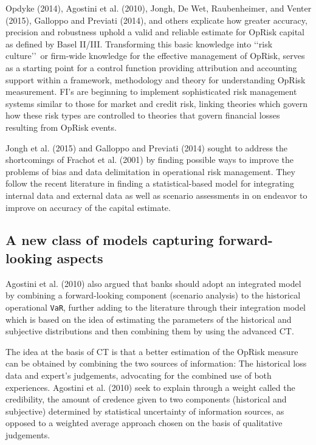 \documentclass[]{DissertateUSU}
\begin{document}
Opdyke (2014), Agostini et al. (2010), Jongh, De Wet, Raubenheimer, and
Venter (2015), Galloppo and Previati (2014), and others explicate how
greater accuracy, precision and robustness uphold a valid and reliable
estimate for OpRisk capital as defined by Basel II/III. Transforming
this basic knowledge into \lq\lq risk culture\rq\rq~or firm-wide
knowledge for the effective management of OpRisk, serves as a starting
point for a control function providing attribution and accounting
support within a framework, methodology and theory for understanding
OpRisk measurement. FI's are beginning to implement sophisticated risk
management systems similar to those for market and credit risk, linking
theories which govern how these risk types are controlled to theories
that govern financial losses resulting from OpRisk events. \medskip

Jongh et al. (2015) and Galloppo and Previati (2014) sought to address
the shortcomings of Frachot et al. (2001) by finding possible ways to
improve the problems of bias and data delimitation in operational risk
management. They follow the recent literature in finding a
statistical-based model for integrating internal data and external data
as well as scenario assessments in on endeavor to improve on accuracy of
the capital estimate.

\subsection{A new class of models capturing forward-looking aspects}
\label{ssec:A new class of models capturing forward-looking aspects}

Agostini et al. (2010) also argued that banks should adopt an integrated
model by combining a forward-looking component (scenario analysis) to
the historical operational \texttt{VaR}, further adding to the
literature through their integration model which is based on the idea of
estimating the parameters of the historical and subjective distributions
and then combining them by using the advanced CT. \medskip

The idea at the basis of CT is that a better estimation of the OpRisk
measure can be obtained by combining the two sources of information: The
historical loss data and expert's judgements, advocating for the
combined use of both experiences. Agostini et al. (2010) seek to explain
through a weight called the credibility, the amount of credence given to
two components (historical and subjective) determined by statistical
uncertainty of information sources, as opposed to a weighted average
approach chosen on the basis of qualitative judgements.\medskip
\end{document}
